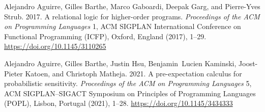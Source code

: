 \label{paper-last-page}




\newcommand{\SortNoop}[1]{}
\begin{thebibliography}{35}



\ifx \showCODEN    \undefined {}     \fi
\ifx \showDOI      \undefined \def \showDOI       #1{#1}\fi
\ifx \showISBNx    \undefined \def \showISBNx     #1{\unskip}     \fi
\ifx \showISBNxiii \undefined \def \showISBNxiii  #1{\unskip}     \fi
\ifx \showISSN     \undefined \def \showISSN      #1{\unskip}     \fi
\ifx \showLCCN     \undefined \def \showLCCN      #1{\unskip}     \fi
\ifx \shownote     \undefined \def \shownote      #1{#1}          \fi
\ifx \showarticletitle \undefined \def \showarticletitle #1{#1}   \fi
\ifx \showURL      \undefined \def \showURL       {\relax}        \fi
\providecommand\bibfield[2]{#2}
\providecommand\bibinfo[2]{#2}
\providecommand\natexlab[1]{#1}
\providecommand\showeprint[2][]{arXiv:#2}

\bibfield{author}{\bibinfo{person}{Alejandro Aguirre}, \bibinfo{person}{Gilles
  Barthe}, \bibinfo{person}{Marco Gaboardi}, \bibinfo{person}{Deepak Garg},
  {and} \bibinfo{person}{Pierre-Yves Strub}.} \bibinfo{year}{2017}\natexlab{}.
\newblock \showarticletitle{A relational logic for higher-order programs}.
\newblock \bibinfo{journal}{\emph{Proceedings of the {ACM} on Programming
  Languages}} \bibinfo{volume}{1}, \bibinfo{number}{{ACM} {SIGPLAN}
  {I}nternational {C}onference on {F}unctional {P}rogramming ({ICFP}), Oxford,
  England} (\bibinfo{year}{2017}), \bibinfo{pages}{1--29}.
\newblock
\urldef\tempurl \url{https://doi.org/10.1145/3110265}
\showDOI{\tempurl}


\bibfield{author}{\bibinfo{person}{Alejandro Aguirre}, \bibinfo{person}{Gilles
  Barthe}, \bibinfo{person}{Justin Hsu}, \bibinfo{person}{Benjamin~Lucien
  Kaminski}, \bibinfo{person}{Joost-Pieter Katoen}, {and}
  \bibinfo{person}{Christoph Matheja}.} \bibinfo{year}{2021}\natexlab{}.
\newblock \showarticletitle{A pre-expectation calculus for probabilistic
  sensitivity}.
\newblock \bibinfo{journal}{\emph{Proceedings of the {ACM} on Programming
  Languages}} \bibinfo{volume}{5}, \bibinfo{number}{{ACM} {SIGPLAN--SIGACT}
  {S}ymposium on {P}rinciples of {P}rogramming {L}anguages ({POPL}), Lisbon,
  Portugal} (\bibinfo{year}{2021}), \bibinfo{pages}{1--28}.
\newblock
\urldef\tempurl \url{https://doi.org/10.1145/3434333}
\showDOI{\tempurl}



\end{thebibliography}
